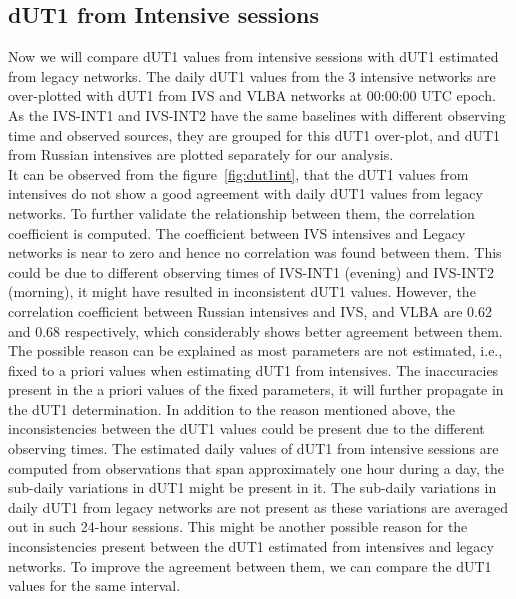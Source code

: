 \documentclass[smallextended]{svjour3}       %
\begin{document}
\subsection{dUT1 from Intensive sessions}
Now we will compare dUT1 values from intensive sessions with dUT1 estimated from legacy networks. The daily dUT1 values from the 3 intensive networks are over-plotted with dUT1 from IVS and VLBA networks at 00:00:00 UTC epoch. As the IVS-INT1 and IVS-INT2 have the same baselines with different observing time and observed sources, they are grouped for this dUT1 over-plot, and dUT1 from Russian intensives are plotted separately for our analysis. \\
It can be observed from the figure~\ref{fig:dut1int}, that the dUT1 values from intensives do not show a good agreement with daily dUT1 values from legacy networks. To further validate the relationship between them, the correlation coefficient is computed. The coefficient between IVS intensives and Legacy networks is near to zero and hence no correlation was found between them. This could be due to different observing times of IVS-INT1 (evening) and IVS-INT2 (morning), it might have resulted in inconsistent dUT1 values. However, the correlation coefficient between Russian intensives and IVS, and VLBA are 0.62 and 0.68 respectively, which considerably shows better agreement between them. The possible reason can be explained as most parameters are not estimated, i.e., fixed to a priori values when estimating dUT1 from intensives. The inaccuracies present in the a priori values of the fixed parameters, it will further propagate in the dUT1 determination. In addition to the reason mentioned above, the inconsistencies between the dUT1 values could be present due to the different observing times. The estimated daily values of dUT1 from intensive sessions are computed from observations that span approximately one hour during a day, the sub-daily variations in dUT1 might be present in it. The sub-daily variations in daily dUT1 from legacy networks are not present as these variations are averaged out in such 24-hour sessions. This might be another possible reason for the inconsistencies present between the dUT1 estimated from intensives and legacy networks. To improve the agreement between them, we can compare the dUT1 values for the same interval. \\
\end{document}
